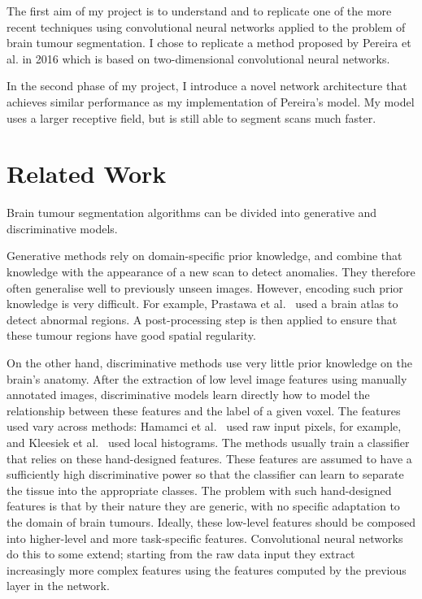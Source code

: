 \documentclass[12pt,a4paper,twoside,openright]{report}
\begin{document}
The first aim of my project is to understand and to replicate one of the more recent techniques using convolutional neural networks applied to the problem of brain tumour segmentation. I chose to replicate a method proposed by Pereira et al.\cite{pereira} in 2016 which is based on two-dimensional convolutional neural networks. 

In the second phase of my project, I introduce a novel network architecture that achieves similar performance as my implementation of Pereira's model. My model uses a larger receptive field, but is still able to segment scans much faster.

\section{Related Work}
Brain tumour segmentation algorithms can be divided into generative and discriminative models.

Generative methods rely on domain-specific prior knowledge, and combine that knowledge with the appearance of a new scan to detect anomalies. They therefore often generalise well to previously unseen images. However, encoding such prior knowledge is very difficult. For example, Prastawa et al.\ \cite{prastawa} used a brain atlas to detect abnormal regions. A post-processing step is then applied to ensure that these tumour regions have good spatial regularity.

On the other hand, discriminative methods use very little prior knowledge on the brain's anatomy. After the extraction of low level image features using manually annotated images, discriminative models learn directly how to model the relationship between these features and the label of a given voxel. The features used vary across methods: Hamamci et al.\ \cite{hamamci} used raw input pixels, for example, and Kleesiek et al.\ \cite{kleesiek} used local histograms. The methods usually train a classifier that relies on these hand-designed features. These features are assumed to have a sufficiently high discriminative power so that the classifier can learn to separate the tissue into the appropriate classes. The problem with such hand-designed features is that by their nature they are generic, with no specific adaptation to the domain of brain tumours. Ideally, these low-level features should be composed into higher-level and more task-specific features. Convolutional neural networks do this to some extend; starting from the raw data input they extract increasingly more complex features using the features computed by the previous layer in the network.
\end{document}
